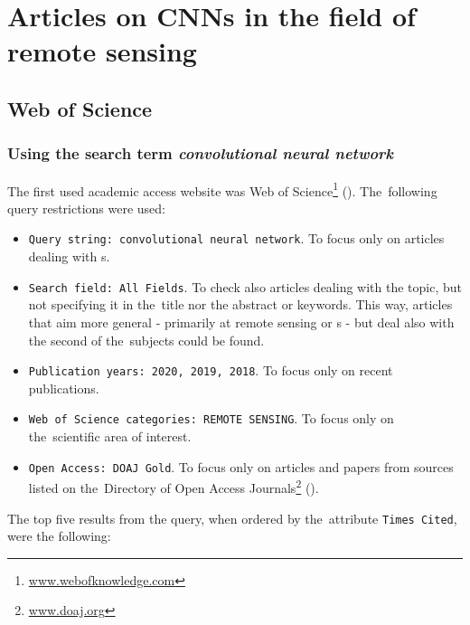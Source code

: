 \section{Articles on CNNs in the field of remote sensing}
\label{top-papers}

\subsection{Web of Science}
\label{wos-papers}

\subsubsection{Using the search term \textit{convolutional neural network}}
\label{wos-papers-full-length}

The first used academic access website was Web of Science\footnote{\url{www.webofknowledge.com}} (). The~following query restrictions were used:

\begin{itemize}
	\item \verb|Query string: convolutional neural network|. To focus only on articles dealing with s.
	\item \verb|Search field: All Fields|. To check also articles dealing with the topic, but not specifying it in the~title nor the abstract or keywords. This way, articles that aim more general - primarily at remote sensing or s - but deal also with the second of the~subjects could be found.
	\item \verb|Publication years: 2020, 2019, 2018|. To focus only on recent publications.
	\item \verb|Web of Science categories: REMOTE SENSING|. To focus only on the~scien\-ti\-fic area of interest.
	\item \verb|Open Access: DOAJ Gold|. To focus only on articles and papers from sources listed on the~Di\-rectory of Open Access Journals\footnote{\url{www.doaj.org}} ().
\end{itemize}

\noindent The top five results from the query, when ordered by the~attribute \verb|Times Cited|, were the following:

